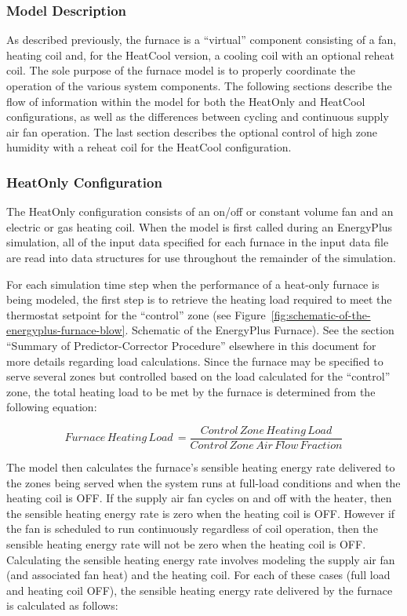 \subsubsection{Model Description}\label{model-description-1}

As described previously, the furnace is a ``virtual'' component consisting of a fan, heating coil and, for the HeatCool version, a cooling coil with an optional reheat coil. The sole purpose of the furnace model is to properly coordinate the operation of the various system components. The following sections describe the flow of information within the model for both the HeatOnly and HeatCool configurations, as well as the differences between cycling and continuous supply air fan operation. The last section describes the optional control of high zone humidity with a reheat coil for the HeatCool configuration.

\subsubsection{HeatOnly Configuration}\label{heatonly-configuration}

The HeatOnly configuration consists of an on/off or constant volume fan and an electric or gas heating coil. When the model is first called during an EnergyPlus simulation, all of the input data specified for each furnace in the input data file are read into data structures for use throughout the remainder of the simulation.

For each simulation time step when the performance of a heat-only furnace is being modeled, the first step is to retrieve the heating load required to meet the thermostat setpoint for the ``control'' zone (see Figure~\ref{fig:schematic-of-the-energyplus-furnace-blow}. Schematic of the EnergyPlus Furnace). See the section ``Summary of Predictor-Corrector Procedure'' elsewhere in this document for more details regarding load calculations. Since the furnace may be specified to serve several zones but controlled based on the load calculated for the ``control'' zone, the total heating load to be met by the furnace is determined from the following equation:

\begin{equation}
Furnace\,Heating\,Load\, = \frac{{Control\,Zone\,Heating\,Load}}{{Control\,Zone\,Air\,Flow\,Fraction}}
\end{equation}

The model then calculates the furnace's sensible heating energy rate delivered to the zones being served when the system runs at full-load conditions and when the heating coil is OFF. If the supply air fan cycles on and off with the heater, then the sensible heating energy rate is zero when the heating coil is OFF. However if the fan is scheduled to run continuously regardless of coil operation, then the sensible heating energy rate will not be zero when the heating coil is OFF. Calculating the sensible heating energy rate involves modeling the supply air fan (and associated fan heat) and the heating coil. For each of these cases (full load and heating coil OFF), the sensible heating energy rate delivered by the furnace is calculated as follows:

